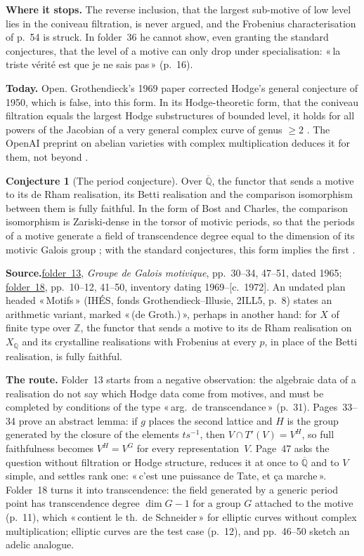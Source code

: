 \documentclass[11pt]{article}
\newcommand{\q}[1]{«\,#1\,»}
\newcommand{\fac}[1]{\href{https://grothendieck.umontpellier.fr/#1.pdf}{folder~#1}}
\theoremstyle{definition}
\theoremstyle{plain}\newtheorem*{proposition}{Proposition}\theoremstyle{definition}
\newtheorem{bigconj}{Conjecture}
\newcommand{\entry}[1]{\par\medskip\noindent\textbf{#1}\enspace}
\newcommand{\src}[1]{\entry{Source.}#1}
\begin{document}
\entry{Where it stops.} The reverse inclusion, that the largest sub-motive of low level lies in the coniveau filtration, is never argued, and the Frobenius characterisation of p.~54 is struck. In folder~36 he cannot show, even granting the standard conjectures, that the level of a motive can only drop under specialisation: \q{la triste vérité est que je ne sais pas} (p.~16).

\entry{Today.} Open. Grothendieck's 1969 paper corrected Hodge's general conjecture of 1950, which is false, into this form. In its Hodge-theoretic form, that the coniveau filtration equals the largest Hodge substructures of bounded level, it holds for all powers of the Jacobian of a very general complex curve of genus $\ge 2$ \cite[Prop.~6.5]{arapura}. The OpenAI preprint on abelian varieties with complex multiplication deduces it for them, not beyond \cite{openaimath}.

\begin{bigconj}[The period conjecture]\label{c:per}
Over $\overline{\mathbb Q}$, the functor that sends a motive to its de Rham realisation, its Betti realisation and the comparison isomorphism between them is fully faithful. In the form of Bost and Charles, the comparison isomorphism is Zariski-dense in the torsor of motivic periods, so that the periods of a motive generate a field of transcendence degree equal to the dimension of its motivic Galois group \cite[Conj.~2.12]{bostcharles}; with the standard conjectures, this form implies the first \cite[Prop.~2.13]{bostcharles}.
\end{bigconj}

\src{\fac{13}, \emph{Groupe de Galois motivique}, pp.~30--34, 47--51, dated 1965; \fac{18}, pp.~10--12, 41--50, inventory dating 1969--[c.~1972]. An undated plan headed \q{Motifs} (IHÉS, fonds Grothendieck--Illusie, 2ILL5, p.~8) states an arithmetic variant, marked \q{(de Groth.)}, perhaps in another hand: for $X$ of finite type over $\mathbb Z$, the functor that sends a motive to its de Rham realisation on $X_{\mathbb Q}$ and its crystalline realisations with Frobenius at every $p$, in place of the Betti realisation, is fully faithful.}

\entry{The route.} Folder~13 starts from a negative observation: the algebraic data of a realisation do not say which Hodge data come from motives, and must be completed by conditions of the type \q{arg.\ de transcendance} (p.~31). Pages~33--34 prove an abstract lemma: if $g$ places the second lattice and $H$ is the group generated by the closure of the elements $ts^{-1}$, then $V \cap T'(V) = V^H$, so full faithfulness becomes $V^H = V^G$ for every representation~$V$. Page~47 asks the question without filtration or Hodge structure, reduces it at once to $\overline{\mathbb Q}$ and to $V$ simple, and settles rank one: \q{c'est une puissance de Tate, et ça marche}. Folder~18 turns it into transcendence: the field generated by a generic period point has transcendence degree $\dim G - 1$ for a group $G$ attached to the motive (p.~11), which \q{contient le th.\ de Schneider} for elliptic curves without complex multiplication; elliptic curves are the test case (p.~12), and pp.~46--50 sketch an adelic analogue.
\end{document}
